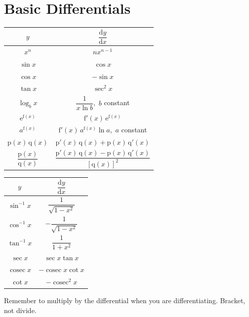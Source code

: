 \documentclass[a4paper,11pt,oneside]{book}
\begin{document}
\section{Basic Differentials}
{\centering\renewcommand{\arraystretch}{1.9}\begin{tabular}{|c|c|}\hline
$y$ & $\dfrac{\mathrm{d}y}{\mathrm{d}x}$\\\hline
$x^{n}$ & $nx^{n-1}$\\\hline
$\sin x$ & $\cos x$\\\hline
$\cos x$ & $-\sin x$\\\hline
$\tan x$ & $\sec^{2}x$\\\hline
$\log_{b}x$ & $\dfrac{1}{x\ln b}$,\ $b$ constant\\\hline
$\mathrm{e}^{\mathrm{f}(x)}$ & $\mathrm{f}'(x)\,\mathrm{e}^{\mathrm{f}(x)}$\\\hline
$a^{\mathrm{f}(x)}$ & $\mathrm{f}'(x)\,a^{\mathrm{f}(x)}\ln a$,\ $a$ constant\\\hline
$\mathrm{p}(x)\,\mathrm{q}(x)$ & $\mathrm{p}'(x)\,\mathrm{q}(x)+\mathrm{p}(x)\,\mathrm{q}'(x)$\\\hline
$\dfrac{\mathrm{p}(x)}{\mathrm{q}(x)}$ & $\dfrac{\mathrm{p}'(x)\,\mathrm{q}(x)-\mathrm{p}(x)\,\mathrm{q}'(x)}{\left[\mathrm{q}(x)\right]^{2}}$\\\hline
\end{tabular}\qquad
\begin{tabular}{|c|c|}\hline
$y$ & $\dfrac{\mathrm{d}y}{\mathrm{d}x}$\\\hline
$\sin^{-1}x$ & $\dfrac{1}{\sqrt{1-x^{2}}}$\\\hline
$\cos^{-1}x$ & $-\dfrac{1}{\sqrt{1-x^{2}}}$\\\hline
$\tan^{-1}x$ & $\dfrac{1}{1+x^{2}}$\\\hline
$\sec x$ & $\sec x\tan x$\\\hline
$\operatorname{cosec}x$ & $-\operatorname{cosec}x\cot x$\\\hline
{\color{blue}$\cot x$} & {\color{blue}$-\operatorname{cosec}^{2}x$}\\\hline
\end{tabular}\par}
\begin{info}[title=Important Note]
Remember to multiply by the differential when you are differentiating. Bracket, not divide.
\end{info}
\end{document}

